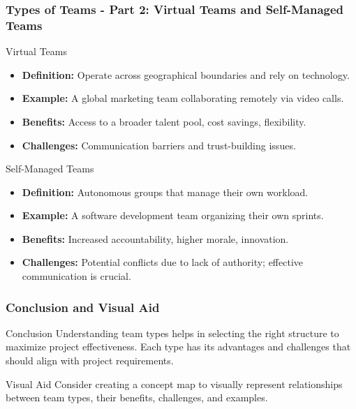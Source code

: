 \documentclass[aspectratio=169]{beamer}
\begin{document}
\begin{frame}[fragile]
    \frametitle{Types of Teams - Part 2: Virtual Teams and Self-Managed Teams}
    \begin{block}{Virtual Teams}
        \begin{itemize}
            \item \textbf{Definition:} Operate across geographical boundaries and rely on technology.
            \item \textbf{Example:} A global marketing team collaborating remotely via video calls.
            \item \textbf{Benefits:} Access to a broader talent pool, cost savings, flexibility.
            \item \textbf{Challenges:} Communication barriers and trust-building issues.
        \end{itemize}
    \end{block}
    
    \begin{block}{Self-Managed Teams}
        \begin{itemize}
            \item \textbf{Definition:} Autonomous groups that manage their own workload.
            \item \textbf{Example:} A software development team organizing their own sprints.
            \item \textbf{Benefits:} Increased accountability, higher morale, innovation.
            \item \textbf{Challenges:} Potential conflicts due to lack of authority; effective communication is crucial.
        \end{itemize}
    \end{block}
\end{frame}

\begin{frame}[fragile]
    \frametitle{Conclusion and Visual Aid}
    \begin{block}{Conclusion}
        Understanding team types helps in selecting the right structure to maximize project effectiveness. Each type has its advantages and challenges that should align with project requirements.
    \end{block}
    
    \begin{block}{Visual Aid}
        Consider creating a concept map to visually represent relationships between team types, their benefits, challenges, and examples.
    \end{block}
\end{frame}
\end{document}
